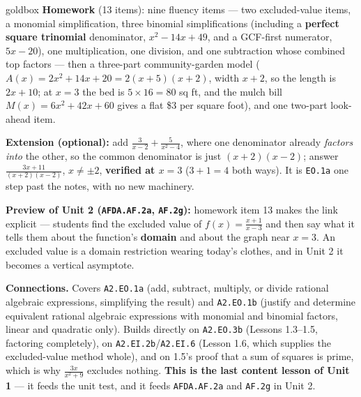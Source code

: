 \documentclass[10pt]{article}
\begin{document}
\boxguard[18]
\begin{skillbox}{goldbox}
\textbf{Homework} (13 items): nine fluency items --- two excluded-value items, a monomial
simplification, three binomial simplifications (including a \textbf{perfect square trinomial}
denominator, $x^2-14x+49$, and a GCF-first numerator, $5x-20$), one multiplication, one division,
and one subtraction whose combined top factors --- then a three-part community-garden model
($A(x)=2x^2+14x+20 = 2(x+5)(x+2)$, width $x+2$, so the length is $2x+10$; at $x=3$ the bed is
$5 \times 16 = 80$ sq ft, and the mulch bill $M(x)=6x^2+42x+60$ gives a flat \$$3$ per square
foot), and one two-part look-ahead item.

\textbf{Extension (optional):} add $\frac{3}{x-2}+\frac{5}{x^2-4}$, where one denominator already
\emph{factors into} the other, so the common denominator is just $(x+2)(x-2)$; answer
$\frac{3x+11}{(x+2)(x-2)}$, $x \ne \pm 2$, \textbf{verified at $x=3$} ($3+1=4$ both ways). It is
\texttt{EO.1a} one step past the notes, with no new machinery.

\textbf{Preview of Unit 2 (\texttt{AFDA.AF.2a}, \texttt{AF.2g}):} homework item 13 makes the link
explicit --- students find the excluded value of $f(x)=\frac{x+1}{x-3}$ and then say what it tells
them about the function's \textbf{domain} and about the graph near $x=3$. An excluded value is a
domain restriction wearing today's clothes, and in Unit 2 it becomes a vertical asymptote.

\textbf{Connections.} Covers \texttt{A2.EO.1a} (add, subtract, multiply, or divide rational
algebraic expressions, simplifying the result) and \texttt{A2.EO.1b} (justify and determine
equivalent rational algebraic expressions with monomial and binomial factors, linear and quadratic
only). Builds directly on \texttt{A2.EO.3b} (Lessons 1.3--1.5, factoring completely), on
\texttt{A2.EI.2b}/\texttt{A2.EI.6} (Lesson 1.6, which supplies the excluded-value method whole),
and on 1.5's proof that a sum of squares is prime, which is why $\frac{3x}{x^2+9}$ excludes
nothing. \textbf{This is the last content lesson of Unit 1} --- it feeds the unit test, and it
feeds \texttt{AFDA.AF.2a} and \texttt{AF.2g} in Unit 2.
\end{skillbox}
\end{document}
